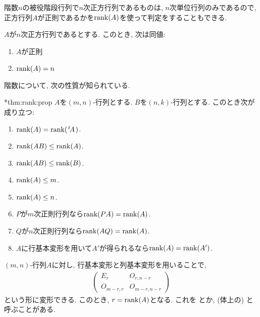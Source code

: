 階数$n$の被役階段行列で$n$次正方行列であるものは,
$n$次単位行列のみであるので,
正方行列$A$が正則であるかを$\operatorname{rank}(A)$を使って判定をすることもできる.
\begin{theorem}
  \label{thm:rank:regular}
  \indexforcriterionofregularity%
  $A$が$n$次正方行列であるとする.
  このとき, 次は同値:
  \begin{enumerate}
  \item\label{thm:rank:regular:reg}
    $A$が正則
  \item\label{thm:rank:regular:rank}
    $\operatorname{rank}(A)=n$
  \end{enumerate}
\end{theorem}


階数について, 次の性質が知られている.


\begin{theorem}
  \provelater**{thm:rank:prop}
  \label{thm:rank:prop}
  $A$を$(m,n)$-行列とする.
  $B$を$(n,k)$-行列とする.
  このとき次が成り立つ:
  \begin{enumerate}
  \item
    \label{thm:rank:prop:trans}
    $\operatorname{rank}(A)=\operatorname{rank}({\left.^{t}\!A\right.})$.
  \item
    \label{thm:rank:prop:left}
    $\operatorname{rank}(AB)\leq\operatorname{rank}(A)$.
  \item
    \label{thm:rank:prop:right}
    $\operatorname{rank}(AB)\leq\operatorname{rank}(B)$.
  \item
    \label{thm:rank:prop:row}
    $\operatorname{rank}(A)\leq m$.
  \item
    \label{thm:rank:prop:col}
    $\operatorname{rank}(A)\leq n$.
  \item
    $P$が$m$次正則行列なら$\operatorname{rank}(PA)=\operatorname{rank}(A)$.
  \item
    \label{thm:rank:prop:regularright}
    $Q$が$n$次正則行列なら$\operatorname{rank}(AQ)=\operatorname{rank}(A)$.
  \item
    \label{thm:rank:prop:fund}
    $A$に行基本変形を用いて$A'$が得られるなら$\operatorname{rank}(A)=\operatorname{rank}(A')$.
  \end{enumerate}
\end{theorem}

\begin{remark}
  $(m,n)$-行列$A$に対し,
  行基本変形と列基本変形を用いることで,
  \begin{align*}
    \left(
    \begin{array}{c|c}
      E_r&O_{r,n-r}\\\hline
      O_{m-r,r}&O_{m-r,n-r}
    \end{array}
    \right)
  \end{align*}
  という形に変形できる.
  このとき, $r=\operatorname{rank}(A)$となる.
  これを
とか,
  (体上の)
  と呼ぶことがある.
\end{remark}

